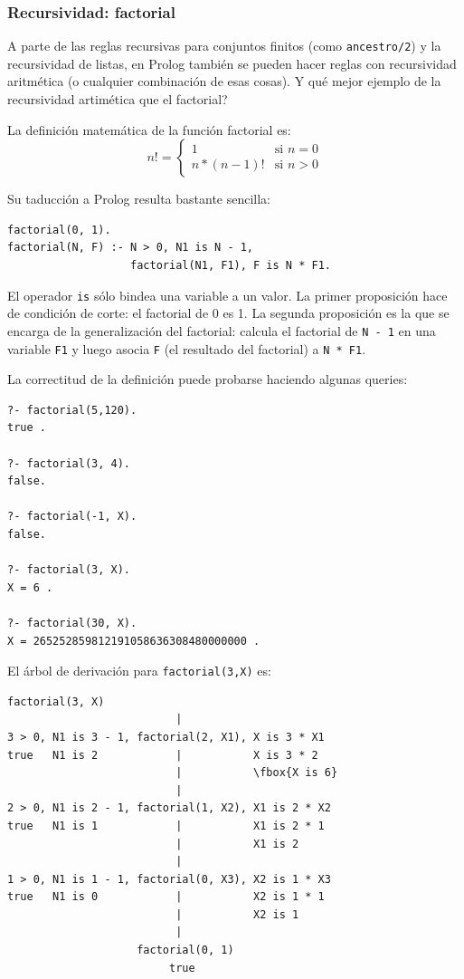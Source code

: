 \documentclass[12pt,titlepage]{article}
\begin{document}
\subsubsection{Recursividad: factorial}

A parte de las reglas recursivas para conjuntos finitos (como \lstinline|ancestro/2|) y la recursividad de listas, en Prolog también se pueden hacer reglas con recursividad aritmética (o cualquier combinación de esas cosas). Y qué mejor ejemplo de la recursividad artimética que el factorial?

La definición matemática de la función factorial es:
\[
n!=\left\{
  \begin{array}{ll}
    1 & \text{si } n=0 \\
    n*(n-1)! & \text{si } n>0
  \end{array}
\right.
\]

Su taducción a Prolog resulta bastante sencilla:
\begin{lstlisting}
factorial(0, 1).
factorial(N, F) :- N > 0, N1 is N - 1, 
                   factorial(N1, F1), F is N * F1.
\end{lstlisting}

El operador \lstinline|is| sólo bindea una variable a un valor. La primer proposición hace de condición de corte: el factorial de 0 es 1. La segunda proposición es la que se encarga de la generalización del factorial: calcula el factorial de \lstinline|N - 1| en una variable \lstinline|F1| y luego asocia \lstinline|F| (el resultado del factorial) a \lstinline|N * F1|.

La correctitud de la definición puede probarse haciendo algunas queries:
\begin{lstlisting}
?- factorial(5,120).
true .

?- factorial(3, 4).
false.

?- factorial(-1, X).
false.

?- factorial(3, X).
X = 6 .

?- factorial(30, X).
X = 265252859812191058636308480000000 .
\end{lstlisting}

El árbol de derivación para \lstinline|factorial(3,X)| es:
\begin{Verbatim}[samepage=true,fontsize=\small,commandchars=\\\{\}]
                    factorial(3, X)
                          |
3 > 0, N1 is 3 - 1, factorial(2, X1), X is 3 * X1
true   N1 is 2            |           X is 3 * 2
                          |           \fbox{X is 6}
                          |
2 > 0, N1 is 2 - 1, factorial(1, X2), X1 is 2 * X2
true   N1 is 1            |           X1 is 2 * 1
                          |           X1 is 2
                          |
1 > 0, N1 is 1 - 1, factorial(0, X3), X2 is 1 * X3
true   N1 is 0            |           X2 is 1 * 1
                          |           X2 is 1
                          |
                    factorial(0, 1)
                         true
\end{Verbatim}
\end{document}
